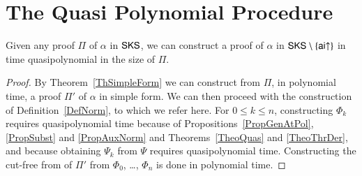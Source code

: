 

\section{The Quasi Polynomial Procedure}



\begin{theorem}\label{ThPreNorm}
Given any proof\/ $\Pi$ of $\alpha$ in\/ $\mathsf{SKS}$, we can construct a proof of $\alpha$ in\/ $\mathsf{SKS}\setminus\{\mathsf{ai}{\uparrow}\}$ in time quasipolynomial in the size of\/ $\Pi$.
\end{theorem}

\begin{proof}
By Theorem~\ref{ThSimpleForm} we can construct from $\Pi$, in polynomial time, a proof $\Pi'$ of $\alpha$ in simple form. We can then proceed with the construction of Definition~\ref{DefNorm}, to which we refer here. For $0\le k\le n$, constructing $\Phi_k$ requires quasipolynomial time because of Propositions~\ref{PropGenAtPol}, \ref{PropSubst} and \ref{PropAuxNorm} and Theorems~\ref{TheoQuas} and \ref{TheoThrDer}, and because obtaining $\Psi_k$ from $\Psi$ requires quasipolynomial time. Constructing the cut-free from of $\Pi'$ from $\Phi_0$, \dots, $\Phi_n$ is done in polynomial time.
\end{proof}

